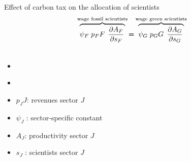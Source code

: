 \documentclass[11pt,aspectratio=169]{beamer}
\begin{document}
\begin{frame}{Effect of carbon tax on the allocation of scientists}
	\vspace{0mm}
	\large
	\begin{align*}		
		\color{black}
		\overbrace{{\psi_F} \textcolor{black!1}{\underbrace{\textcolor{black}{p_F{F}}}_{{{\tau_F\uparrow\Rightarrow\downarrow}}}}\textcolor{black!1}{\underbrace{\textcolor{black}{\frac{\partial A_{F}}{\partial s_{F}}}}_{{{s_F\downarrow\Rightarrow\uparrow}}}}}^{\text{wage fossil scientists}}{\pmb{=}}\overbrace{{\psi_G} \textcolor{black!1}{\underbrace{\textcolor{black}{p_GG}}_{{{\tau_F\uparrow\Rightarrow\uparrow}}}}\textcolor{black!1}{\underbrace{\textcolor{black}{\frac{\partial A_{G}}{\partial s_{G}}}}_{	{{s_G\uparrow\Rightarrow\downarrow}}}}}^{\text{wage green scientists}}
	\end{align*}
	\normalsize
	\begin{itemize}
		\item[] \ %
		\vspace{2mm}
		\item[] \  %
	\end{itemize}
	\small
	\vspace{4mm}
	\hspace{-2mm}
	\begin{minipage}[t!]{0.4\textwidth}
		\vspace{0mm}
		\begin{itemize}
			\item[] $p_JJ$: revenues sector $J$
			\vspace{-2mm}
			\item[] $\psi_J$ : sector-specific constant
		\end{itemize}
	\end{minipage}
	\vspace{-5mm}
	\begin{minipage}[t!]{0.5\textwidth}
		\vspace{0mm}
		\begin{itemize}	
			\item[] $A_J$: productivity sector $J$
			\vspace{-2mm}			
			\item[] $s_J$ : scientists sector $J$
		\end{itemize}
	\end{minipage}
\end{frame}
\end{document}
